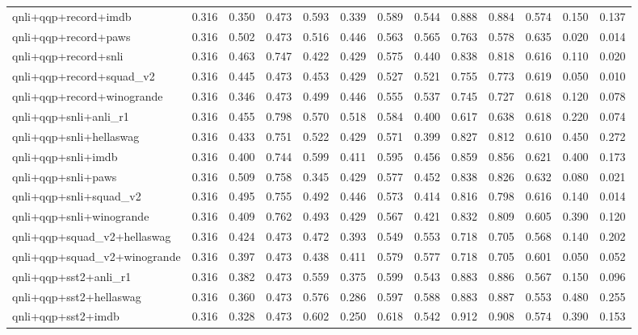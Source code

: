 \begin{table}[t]
\begin{tabular}{lrrrrrrrrrrrr}
    qnli+qqp+record+imdb & 0.316 & 0.350 & 0.473 & 0.593 & 0.339 & 0.589 & 0.544 & 0.888 & 0.884 & 0.574 & 0.150 & 0.137 \\
    qnli+qqp+record+paws & 0.316 & 0.502 & 0.473 & 0.516 & 0.446 & 0.563 & 0.565 & 0.763 & 0.578 & 0.635 & 0.020 & 0.014 \\
    qnli+qqp+record+snli & 0.316 & 0.463 & 0.747 & 0.422 & 0.429 & 0.575 & 0.440 & 0.838 & 0.818 & 0.616 & 0.110 & 0.020 \\
    qnli+qqp+record+squad\_v2 & 0.316 & 0.445 & 0.473 & 0.453 & 0.429 & 0.527 & 0.521 & 0.755 & 0.773 & 0.619 & 0.050 & 0.010 \\
    qnli+qqp+record+winogrande & 0.316 & 0.346 & 0.473 & 0.499 & 0.446 & 0.555 & 0.537 & 0.745 & 0.727 & 0.618 & 0.120 & 0.078 \\
    qnli+qqp+snli+anli\_r1 & 0.316 & 0.455 & 0.798 & 0.570 & 0.518 & 0.584 & 0.400 & 0.617 & 0.638 & 0.618 & 0.220 & 0.074 \\
    qnli+qqp+snli+hellaswag & 0.316 & 0.433 & 0.751 & 0.522 & 0.429 & 0.571 & 0.399 & 0.827 & 0.812 & 0.610 & 0.450 & 0.272 \\
    qnli+qqp+snli+imdb & 0.316 & 0.400 & 0.744 & 0.599 & 0.411 & 0.595 & 0.456 & 0.859 & 0.856 & 0.621 & 0.400 & 0.173 \\
    qnli+qqp+snli+paws & 0.316 & 0.509 & 0.758 & 0.345 & 0.429 & 0.577 & 0.452 & 0.838 & 0.826 & 0.632 & 0.080 & 0.021 \\
    qnli+qqp+snli+squad\_v2 & 0.316 & 0.495 & 0.755 & 0.492 & 0.446 & 0.573 & 0.414 & 0.816 & 0.798 & 0.616 & 0.140 & 0.014 \\
    qnli+qqp+snli+winogrande & 0.316 & 0.409 & 0.762 & 0.493 & 0.429 & 0.567 & 0.421 & 0.832 & 0.809 & 0.605 & 0.390 & 0.120 \\
    qnli+qqp+squad\_v2+hellaswag & 0.316 & 0.424 & 0.473 & 0.472 & 0.393 & 0.549 & 0.553 & 0.718 & 0.705 & 0.568 & 0.140 & 0.202 \\
    qnli+qqp+squad\_v2+winogrande & 0.316 & 0.397 & 0.473 & 0.438 & 0.411 & 0.579 & 0.577 & 0.718 & 0.705 & 0.601 & 0.050 & 0.052 \\
    qnli+qqp+sst2+anli\_r1 & 0.316 & 0.382 & 0.473 & 0.559 & 0.375 & 0.599 & 0.543 & 0.883 & 0.886 & 0.567 & 0.150 & 0.096 \\
    qnli+qqp+sst2+hellaswag & 0.316 & 0.360 & 0.473 & 0.576 & 0.286 & 0.597 & 0.588 & 0.883 & 0.887 & 0.553 & 0.480 & 0.255 \\
    qnli+qqp+sst2+imdb & 0.316 & 0.328 & 0.473 & 0.602 & 0.250 & 0.618 & 0.542 & 0.912 & 0.908 & 0.574 & 0.390 & 0.153 \\

\end{tabular}
\end{table}
